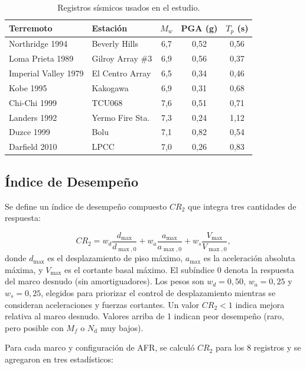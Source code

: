 \documentclass[preprint,12pt,authoryear]{elsarticle}
\newcommand{\nd}{N_{\mathrm{d}}}
\newcommand{\Mf}{M_{\!f}}
\begin{document}
\begin{table}[htbp]
\centering
\caption{Registros sísmicos usados en el estudio.}
\label{tab:records}
\small
\begin{tabular}{@{}llccc@{}}
\toprule
Terremoto & Estación & $M_w$ & PGA (g) & $T_p$ (s) \\
\midrule
Northridge 1994         & Beverly Hills     & 6,7 & 0,52 & 0,56 \\
Loma Prieta 1989        & Gilroy Array \#3  & 6,9 & 0,56 & 0,37 \\
Imperial Valley 1979    & El Centro Array   & 6,5 & 0,34 & 0,46 \\
Kobe 1995               & Kakogawa          & 6,9 & 0,31 & 0,68 \\
Chi-Chi 1999            & TCU068            & 7,6 & 0,51 & 0,71 \\
Landers 1992            & Yermo Fire Sta.   & 7,3 & 0,24 & 1,12 \\
Duzce 1999              & Bolu              & 7,1 & 0,82 & 0,54 \\
Darfield 2010           & LPCC              & 7,0 & 0,26 & 0,83 \\
\bottomrule
\end{tabular}
\end{table}

\subsection{Índice de Desempeño}
\label{sec:performance_index}

Se define un índice de desempeño compuesto $CR_2$ que integra tres cantidades de respuesta:

\begin{equation}
  CR_2 = w_d \frac{d_{\max}}{d_{\max,0}} + w_a \frac{a_{\max}}{a_{\max,0}} 
         + w_s \frac{V_{\max}}{V_{\max,0}},
  \label{eq:cr2}
\end{equation}
donde $d_{\max}$ es el desplazamiento de piso máximo, $a_{\max}$ es la aceleración absoluta 
máxima, y $V_{\max}$ es el cortante basal máximo. El subíndice 0 denota la respuesta del marco 
desnudo (sin amortiguadores). Los pesos son $w_d = 0{,}50$, $w_a = 0{,}25$ y $w_s = 0{,}25$, 
elegidos para priorizar el control de desplazamiento mientras se consideran aceleraciones y 
fuerzas cortantes. Un valor $CR_2 < 1$ indica mejora relativa al marco desnudo. Valores arriba 
de 1 indican peor desempeño (raro, pero posible con $\Mf$ o $\nd$ muy bajos).

Para cada marco y configuración de AFR, se calculó $CR_2$ para los 8 registros y se agregaron 
en tres estadísticos:
\end{document}
